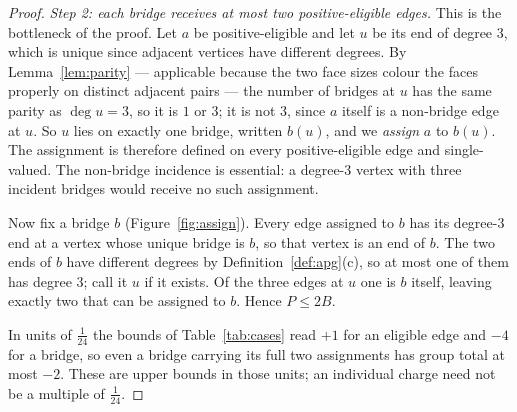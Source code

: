 \documentclass{baustms}
\theoremstyle{cupthm}
\theoremstyle{cupdefn}
\theoremstyle{cuprem}
\begin{document}
\begin{proof}
\smallskip
\emph{Step 2: each bridge receives at most two positive-eligible edges.} This is
the bottleneck of the proof. Let $a$ be positive-eligible and let $u$ be its end
of degree $3$, which is unique since adjacent vertices have different degrees. By
Lemma~\ref{lem:parity} --- applicable because the two face sizes colour the faces
properly on distinct adjacent pairs --- the number of bridges at $u$ has the same
parity as $\deg u = 3$, so it is $1$ or $3$; it is not $3$, since $a$ itself is a
non-bridge edge at $u$. So $u$ lies on exactly one bridge, written $b(u)$, and we
\emph{assign} $a$ to $b(u)$. The assignment is therefore defined on every
positive-eligible edge and single-valued. The non-bridge incidence is essential:
a degree-$3$ vertex with three incident bridges would receive no such assignment.

Now fix a bridge $b$ (Figure~\ref{fig:assign}). Every edge assigned to $b$ has its degree-$3$ end at a
vertex whose unique bridge is $b$, so that vertex is an end of $b$. The two ends
of $b$ have different degrees by Definition~\ref{def:apg}(c), so at most one of
them has degree $3$; call it $u$ if it exists. Of the three edges at $u$ one is
$b$ itself, leaving exactly two that can be assigned to $b$. Hence $P \le 2B$.

In units of $\tfrac1{24}$ the bounds of Table~\ref{tab:cases} read $+1$ for an
eligible edge and $-4$ for a bridge, so even a bridge carrying its full two
assignments has group total at most $-2$. These are upper bounds in those units;
an individual charge need not be a multiple of $\tfrac1{24}$.


\end{proof}
\end{document}
